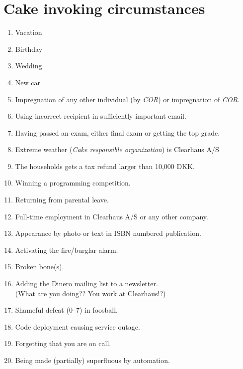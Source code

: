 \documentclass[a4paper, oneside, article]{memoir}
\newcounter{tbc}
\begin{document}
\chapter{Cake invoking circumstances}
\label{chp:circumstances}
\begin{enumerate}[§ 1]
  \setcounter{enumi}{\value{tbc}}

  \item Vacation
  \item Birthday
  \item Wedding
  \item New car
  \item Impregnation of any other individual (by \emph{COR}) or impregnation of
    \emph{COR}.
  \item Using incorrect recipient in sufficiently important email.
  \item Having passed an exam, either final exam or getting the top grade.
  \item Extreme weather (\emph{Cake responsible organization}) is Clearhaus A/S
  \item The households gets a tax refund larger than 10,000 DKK\@.
  \item Winning a programming competition.
  \item Returning from parental leave.
  \item Full-time employment in Clearhaus A/S or any other company.
  \item Appearance by photo or text in ISBN numbered publication.
  \item Activating the fire/burglar alarm.
  \item Broken bone(s).
  \item Adding the Dinero mailing list to a newsletter.\\
    {\tiny (What are you doing?? You work at Clearhaus!?)}
  \item Shameful defeat (0--7) in foosball.
  \item Code deployment causing service outage.
  \item Forgetting that you are on call.
  \item Being made (partially) superfluous by automation.
\end{enumerate}
\end{document}
